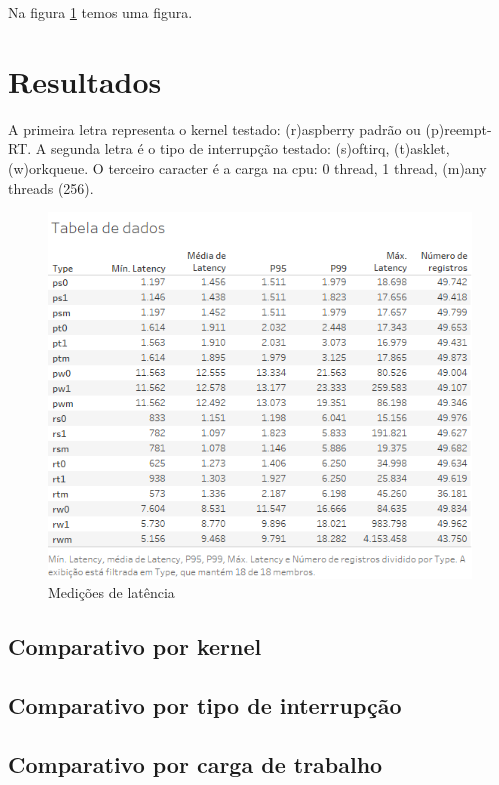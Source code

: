 Na figura \ref{tableau} temos uma figura.

\section{Resultados}

A primeira letra representa o kernel testado: (r)aspberry padrão ou (p)reempt-RT.
A segunda letra é o tipo de interrupção testado: (s)oftirq, (t)asklet, (w)orkqueue.
O terceiro caracter é a carga na cpu: 0 thread, 1 thread, (m)any threads (256).

\begin{figure}[!htb]
    \centering
    \includegraphics{graficos/Tabeladedados.png}
    \caption{Medições de latência}
    \label{tableau}
\end{figure}

\subsection{Comparativo por kernel}
\subsection{Comparativo por tipo de interrupção}
\subsection{Comparativo por carga de trabalho}